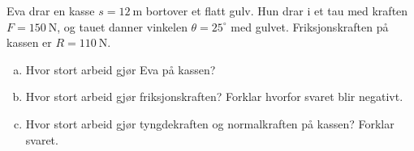 %
Eva drar en kasse $s = \SI{12}{\metre}$ bortover et flatt gulv. Hun drar i et tau med kraften $F = \SI{150}{\newton}$, og tauet danner vinkelen $\theta = 25^\circ$ med gulvet. Friksjonskraften på kassen er $R = \SI{110}{\newton}$.
\begin{enumerate}[a)]
    \item Hvor stort arbeid gjør Eva på kassen?
    \item Hvor stort arbeid gjør friksjonskraften? Forklar hvorfor svaret blir negativt.
    \item Hvor stort arbeid gjør tyngdekraften og normalkraften på kassen? Forklar svaret.
\end{enumerate}
